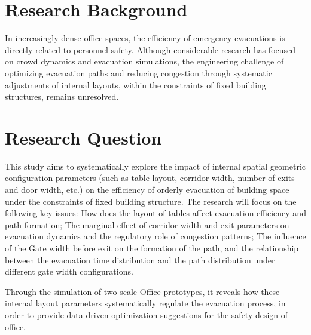 \section{Research Background}
In increasingly dense office spaces, the efficiency of emergency evacuations is directly related to personnel safety. Although considerable research has focused on crowd dynamics and evacuation simulations, the engineering challenge of optimizing evacuation paths and reducing congestion through systematic adjustments of internal layouts, within the constraints of fixed building structures, remains unresolved. 

\section{Research Question}
This study aims to systematically explore the impact of internal spatial geometric configuration parameters (such as table layout, corridor width, number of exits and door width, etc.) on the efficiency of orderly evacuation of building space under the constraints of fixed building structure. The research will focus on the following key issues: How does the layout of tables affect evacuation efficiency and path formation; The marginal effect of corridor width and exit parameters on evacuation dynamics and the regulatory role of congestion patterns; The influence of the Gate width before exit on the formation of the path, and the relationship between the evacuation time distribution and the path distribution under different gate width configurations. 

Through the simulation of two scale Office prototypes, it reveals how these internal layout parameters systematically regulate the evacuation process, in order to provide data-driven optimization suggestions for the safety design of office.

